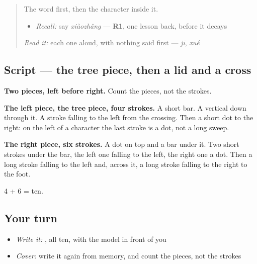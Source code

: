 \begin{quote}
The word first, then the character inside it.

\begin{itemize}
\raggedright
  \item \emph{Recall:} say \emph{xiàozhǎng} — \textbf{R1}, one lesson back, before it decays
\end{itemize}

\begin{quote}
 
\end{quote}

\emph{Read it:} each one aloud, with nothing said first — \emph{jī}, \emph{xué}
\end{quote}

\subsection*{Script — the tree piece, then a lid and a cross}

\begin{quote}
\end{quote}

\textbf{Two pieces, left before right.} Count the pieces, not the strokes.

\textbf{The left piece, the tree piece, four strokes.} A short bar. A vertical down through it. A stroke falling to the left from the crossing. Then a short dot to the right: on the left of a character the last stroke is a dot, not a long sweep.

\textbf{The right piece, six strokes.} A dot on top and a bar under it. Two short strokes under the bar, the left one falling to the left, the right one a dot. Then a long stroke falling to the left and, across it, a long stroke falling to the right to the foot.

4 + 6 = ten.

\subsection*{Your turn}
\begin{itemize}
\raggedright
  \item \emph{Write it:} , all ten, with the model in front of you
  \item \emph{Cover:} write it again from memory, and count the pieces, not the strokes
\end{itemize}

